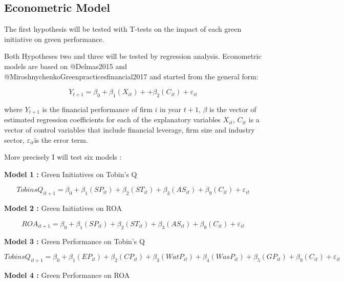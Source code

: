 \documentclass[]{article}
\begin{document}
\subsection{Econometric Model}\label{econometric-model}

The first hypothesis will be tested with T-tests on the impact of each
green initiative on green performance.

Both Hypotheses two and three will be tested by regression analysis.
Econometric models are based on @Delmas2015 and
@MiroshnychenkoGreenpracticesfinancial2017 and started from the general
form:

\begin{equation}
Y_{t+1}=\beta_{0} + \beta_{1} (X_{it}) + + \beta_{2} (C_{it}) + \varepsilon_{it}
\label{GeneralForm}
\end{equation}

where \(Y_{t+1}\) is the financial performance of firm \(i\) in year
\(t+1\), \(\beta\) is the vector of estimated regression coefficients
for each of the explanatory variables \(X_{it}\), \(C_{it}\) is a vector
of control variables that include financial leverage, firm size and
industry sector, \(\varepsilon_{it}\)is the error term.

More precisely I will test six models :

\textbf{Model 1 :} Green Initiatives on Tobin's Q

\begin{equation}
TobinsQ_{it+1}=\beta_{0} + \beta_{1} (SP_{it}) + \beta_{2} (ST_{it}) + \beta_{3} (AS_{it}) + \beta_{9} (C_{it}) + \varepsilon_{it}
\label{M1}
\end{equation}

\textbf{Model 2 :} Green Initiatives on ROA

\begin{equation}
ROA_{it+1}=\beta_{0} + \beta_{1} (SP_{it}) + \beta_{2} (ST_{it}) + \beta_{3} (AS_{it}) + \beta_{9} (C_{it}) + \varepsilon_{it}
\label{M2}
\end{equation}

\textbf{Model 3 :} Green Performance on Tobin's Q

\begin{equation}
TobinsQ_{it+1}=\beta_{0} + \beta_{1} (EP_{it}) + \beta_{2} (CP_{it}) + \beta_{3} (WatP_{it}) + \beta_{4} (WasP_{it}) + \beta_{5} (GP_{it}) + \beta_{9} (C_{it}) + \varepsilon_{it}
\label{M3}
\end{equation}

\textbf{Model 4 :} Green Performance on ROA
\end{document}
